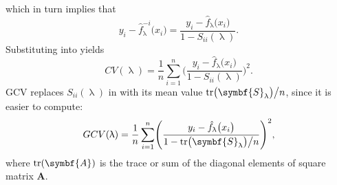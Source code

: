 which in turn implies that
\begin{equation}
  \label{eq:CrossValidationFormalDefinitionOfJackknifedFit3}
  y_i - \hat{f}_\uplambda^{-i}\bigl(x_i\bigr) = \frac{y_i - \hat{f}_\uplambda\bigl(x_i\bigr)}{1 - S_{i i}(\uplambda)}.
\end{equation}
Substituting  into  yields
\begin{equation}
  \label{eq:CrossValidationSumOfSquares02}
  CV(\uplambda) = \frac{1}{n} \sum_{i = 1}^n\Biggl(\frac{y_i - \hat{f}_\uplambda\bigl(x_i\bigr)}{1 - S_{i i}(\uplambda)}\Biggr)^2.
\end{equation}
GCV replaces \(S_{ii}(\uplambda)\) in  with its mean value \(\tr\bigl(\symbf{S}_\uplambda\bigr) \big/ n\), since it is easier to compute:
\begin{equation}
  \label{eq:GeneralizedCrossValidation}
  GCV(\uplambda) = \frac{1}{n} \sum_{i = 1}^n\Biggl(\frac{y_i - \hat{f}_\uplambda\bigl(x_i\bigr)}{1 - \tr\bigl(\symbf{S}_\uplambda\bigr) \big/ n}\Biggr)^2,
\end{equation}
where \(\tr(\symbf{A})\) is the trace or sum of the diagonal elements of square matrix \(\symbf{A}\).

